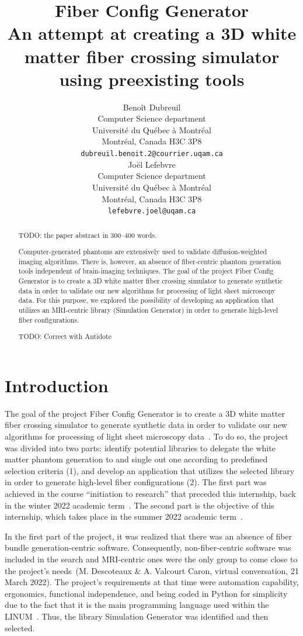 \documentclass{article}
\title{
  Fiber Config Generator \\
  An attempt at creating a 3D white matter fiber crossing simulator using preexisting tools}
\author{
  Benoît Dubreuil \\
  Computer Science department \\
  Université du Québec à Montréal \\
  Montréal, Canada H3C 3P8 \\
  \texttt{dubreuil.benoit.2@courrier.uqam.ca} \\
  \And
  Joël Lefebvre \\
  Computer Science department\\
  Université du Québec à Montréal \\
  Montréal, Canada H3C 3P8\\
  \texttt{lefebvre.joel@uqam.ca} \\
}
\begin{document}
  \maketitle

  \begin{abstract}
    TODO: the paper abstract in 300--400 words.

    Computer-generated phantoms are extensively used to validate diffusion-weighted imaging algorithms.
    There is, however, an absence of fiber-centric phantom generation tools independent of brain-imaging techniques.
    The goal of the project Fiber Config Generator is to create a 3D white matter fiber crossing simulator to generate synthetic data in order to validate our new algorithms for processing of light sheet microscopy data.
    For this purpose, we explored the possibility of developing an application that utilizes an MRI-centric library (Simulation Generator) in order to generate high-level fiber configurations.

    TODO: Correct with Antidote
  \end{abstract}


  \section{Introduction}\label{sec:introduction}

  The goal of the project Fiber Config Generator is to create a 3D white matter fiber crossing simulator to generate synthetic data in order to validate our new algorithms for processing of light sheet microscopy data~\cite{oliveirasicard2021orientation3d}.
  To do so, the project was divided into two parts: identify potential libraries to delegate the white matter phantom
  generation to and single out one according to predefined selection criteria (1), and develop an application that utilizes the selected library in order to generate high-level fiber configurations (2).
  The first part was achieved in the course ``initiation to research'' that preceded this internship, back in the winter 2022 academic term~\cite{dubreuil2022inf6200}.
  The second part is the objective of this internship, which takes place in the summer 2022 academic term~\cite{dubreuil2022inm5803fiberconfiggen, dubreuil2022inm5803simgenfork}.

  In the first part of the project, it was realized that there was an absence of fiber bundle generation-centric software.
  Consequently, non-fiber-centric software was included in the search and MRI-centric ones were the only group to come close to the project's needs~\nocite{descoteauxvalcourtcaron2022othertoolsthanfiberfox}(M. Descoteaux \& A. Valcourt Caron, virtual conversation, 21 March 2022).
  The project's requirements at that time were automation capability, ergonomics, functional independence, and being coded in Python for simplicity due to the fact that it is the main programming language used within the LINUM~\cite{dubreuil2022inf6200}.
  Thus, the library Simulation Generator was identified and then selected.
\end{document}
